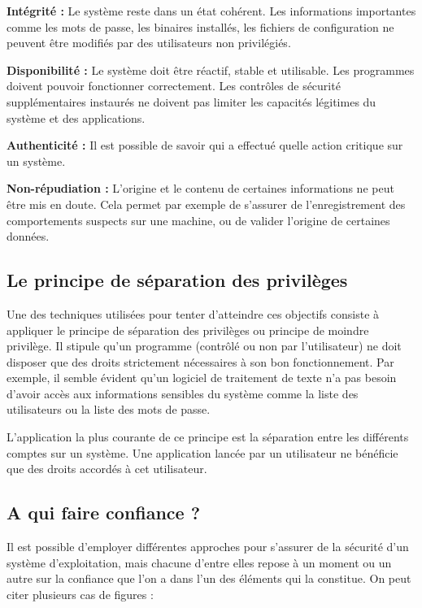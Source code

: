 \textbf{Intégrité :}
Le système reste dans un état cohérent. Les informations importantes comme les mots de passe, les binaires installés, les fichiers de configuration ne peuvent être modifiés par des utilisateurs non privilégiés.

\textbf{Disponibilité :}
Le système doit être réactif, stable et utilisable. Les programmes doivent pouvoir fonctionner correctement. Les contrôles de sécurité supplémentaires instaurés ne doivent pas limiter les capacités légitimes du système et des applications.

\textbf{Authenticité :}
Il est possible de savoir qui a effectué quelle action critique sur un système.

\textbf{Non-répudiation :}
L'origine et le contenu de certaines informations ne peut être mis en doute. Cela permet par exemple de s'assurer de l'enregistrement des comportements suspects sur une machine, ou de valider l'origine de certaines données.

\subsection{Le principe de séparation des privilèges}

Une des techniques utilisées pour tenter d'atteindre ces objectifs consiste à appliquer le principe de séparation des privilèges ou principe de moindre privilège. Il stipule qu'un programme (contrôlé ou non par l'utilisateur) ne doit disposer que des droits strictement nécessaires à son bon fonctionnement. Par exemple, il semble évident qu'un logiciel de traitement de texte n'a pas besoin d'avoir accès aux informations sensibles du système comme la liste des utilisateurs ou la liste des mots de passe.

L'application la plus courante de ce principe est la séparation entre les différents comptes sur un système. Une application lancée par un utilisateur ne bénéficie que des droits accordés à cet utilisateur.

\subsection{A qui faire confiance ?}

Il est possible d'employer différentes approches pour s'assurer de la sécurité d'un système d'exploitation, mais chacune d'entre elles repose à un moment ou un autre sur la confiance que l'on a dans l'un des éléments qui la constitue. On peut citer plusieurs cas de figures \cite{WCS}:

